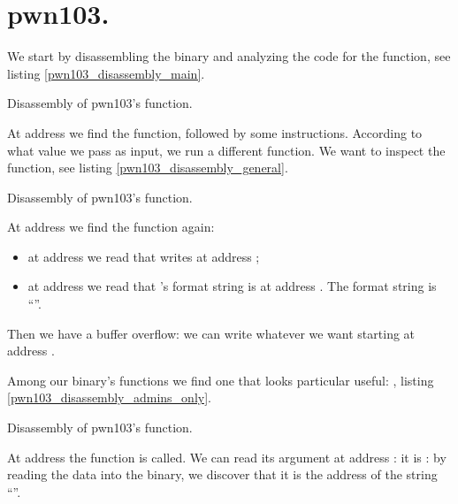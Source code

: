 \section{pwn103.}
\par We start by disassembling the binary and analyzing the code for the  function, see listing \ref{pwn103_disassembly_main}.
\begin{listing}
	{\small}
	\caption{Disassembly of pwn103's  function.}
	\label{pwn103_disassembly_main}
\end{listing}
\par At address  we find the  function, followed by some  instructions. According to what value we pass as input, we run a different function. We want to inspect the  function, see listing \ref{pwn103_disassembly_general}.
\begin{listing}
	
	\caption{Disassembly of pwn103's  function.}
	\label{pwn103_disassembly_general}
\end{listing}
\par At address  we find the  function again:
\begin{itemize}
	\item at address  we read that  writes at address ;
	\item at address  we read that 's format string is at address . The format string is ``''.
\end{itemize}
\par Then we have a buffer overflow: we can write whatever we want starting at address .
\par Among our binary's functions we find one that looks particular useful: , listing \ref{pwn103_disassembly_admins_only}.
\begin{listing}
	
	\caption{Disassembly of pwn103's  function.}
	\label{pwn103_disassembly_admins_only}
\end{listing}
\par At address  the function  is called. We can read its argument at address : it is : by reading the data into the binary, we discover that it is the address of the string ``''.
